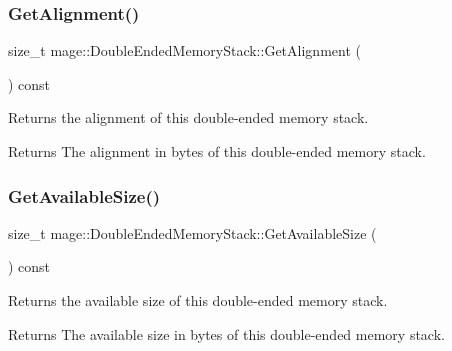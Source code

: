 \subsubsection{\texorpdfstring{Get\+Alignment()}{GetAlignment()}}
{\footnotesize\ttfamily size\+\_\+t mage\+::\+Double\+Ended\+Memory\+Stack\+::\+Get\+Alignment (\begin{DoxyParamCaption}{ }\end{DoxyParamCaption}) const\hspace{0.3cm}{\ttfamily [noexcept]}}

Returns the alignment of this double-\/ended memory stack.

\begin{DoxyReturn}{Returns}
The alignment in bytes of this double-\/ended memory stack. 
\end{DoxyReturn}
\mbox{\label{classmage_1_1_double_ended_memory_stack_a7877cc0fc6a67b610aea51097c44fc8d}} 
\subsubsection{\texorpdfstring{Get\+Available\+Size()}{GetAvailableSize()}}
{\footnotesize\ttfamily size\+\_\+t mage\+::\+Double\+Ended\+Memory\+Stack\+::\+Get\+Available\+Size (\begin{DoxyParamCaption}{ }\end{DoxyParamCaption}) const\hspace{0.3cm}{\ttfamily [noexcept]}}

Returns the available size of this double-\/ended memory stack.

\begin{DoxyReturn}{Returns}
The available size in bytes of this double-\/ended memory stack. 
\end{DoxyReturn}
\mbox{\label{classmage_1_1_double_ended_memory_stack_aecc40b9efe5a18d0c95ca9d6e063bf38}} 
